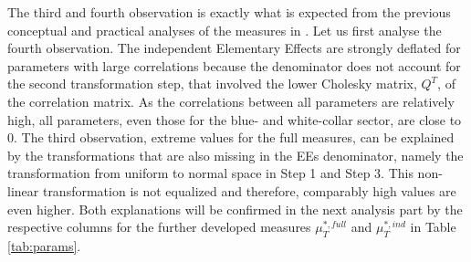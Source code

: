 \documentclass[a4paper,12pt]{article}
\begin{document}
\noindent
The third and fourth observation is exactly what is expected from the previous conceptual and practical analyses of the measures in \cite{ge2017extending}. Let us first analyse the fourth observation. The independent Elementary Effects are strongly deflated for parameters with large correlations because the denominator does not account for the second transformation step, that involved the lower Cholesky matrix, $Q^T$, of the correlation matrix. As the correlations between all parameters are relatively high, all parameters, even those for the blue- and white-collar sector, are close to 0. The third observation, extreme values for the full measures, can be explained by the transformations that are also missing in the EEs denominator, namely the transformation from uniform to normal space in Step 1 and Step 3. This non-linear transformation is not equalized and therefore, comparably high values are even higher. Both explanations will be confirmed in the next analysis part by the respective columns for the further developed measures $\mu^{*,full}_T$ and $\mu^{*,ind}_T$ in Table \ref{tab:params}.
\newpage
\setlength{\tabcolsep}{22pt} %
\end{document}
